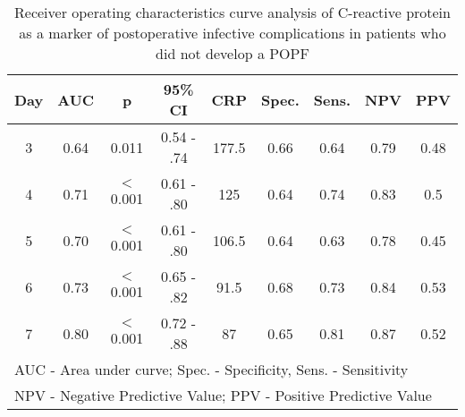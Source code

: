 \begin{table}[h]
	\centering
	\caption{Receiver operating characteristics curve analysis of C-reactive protein as a marker of postoperative infective complications in patients who did not develop a POPF}
	\label{table:crp_comp_ROC_infections_noPOPF}
	\renewcommand{\arraystretch}{1.2} %
	\begin{tabular}{| c | c c c | c c c c c |}
		\hline
		Day & AUC  & p        & 95\% CI    & CRP   & Spec. & Sens. & NPV  & PPV              \\ \hline
		3   & 0.64 & 0.011    & 0.54 - .74 & 177.5 & 0.66  & 0.64  & 0.79 & 0.48             \\
		4   & 0.71 & $<$0.001 & 0.61 - .80 & 125   & 0.64  & 0.74  & 0.83 & 0.5              \\
		5   & 0.70 & $<$0.001 & 0.61 - .80 & 106.5 & 0.64  & 0.63  & 0.78 & 0.45             \\
		6   & 0.73 & $<$0.001 & 0.65 - .82 & 91.5  & 0.68  & 0.73  & 0.84 & 0.53             \\
		7   & 0.80 & $<$0.001 & 0.72 - .88 & 87    & 0.65  & 0.81  & 0.87 & 0.52             \\ \hline
		\multicolumn{9}{l}{AUC - Area under curve; Spec. - Specificity, Sens. - Sensitivity} \\
		\multicolumn{9}{l}{NPV - Negative Predictive Value; PPV - Positive Predictive Value}
	\end{tabular}
\end{table}